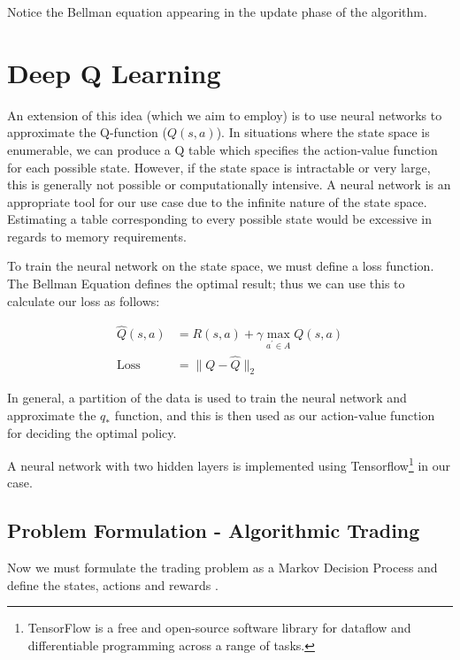 \documentclass[12pt, authoryear]{elsarticle}
\begin{document}
Notice the Bellman equation appearing in the update phase of the algorithm.

\section{Deep Q Learning}
An extension of this idea (which we aim to employ) is to use neural networks to approximate the Q-function ($Q(s, a)$). In situations where the state space is enumerable, we can produce a Q table which specifies the action-value function for each possible state. However, if the state space is intractable or very large, this is generally not possible or computationally intensive. A neural network is an appropriate tool for our use case due to the infinite nature of the state space. Estimating a table corresponding to every possible state would be excessive in regards to memory requirements.

To train the neural network on the state space, we must define a loss function. The Bellman Equation defines the optimal result; thus we can use this to calculate our loss as follows:

$$
\begin{aligned}
\hat { Q } ( s , a ) &= R ( s , a ) + \gamma \max _ { a ^ { \prime } \in A } Q ( s , a ) \\
\text {Loss} &= \| Q - \hat { Q } \| _ { 2 }
\end{aligned}
$$

In general, a partition of the data is used to train the neural network and approximate the $q_{*}$ function, and this is then used as our action-value function for deciding the optimal policy.

A neural network with two hidden layers is implemented using Tensorflow\footnote{TensorFlow is a free and open-source software library for dataflow and differentiable programming across a range of tasks.} in our case.

\subsection{Problem Formulation - Algorithmic Trading}
Now we must formulate the trading problem as a Markov Decision Process and define the states, actions and rewards \citep{xiong2018practical}.
\end{document}
